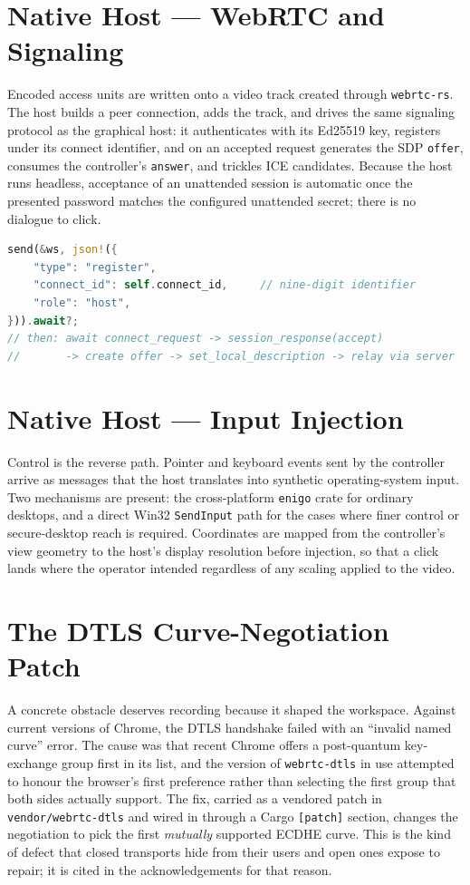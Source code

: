 \section{Native Host --- WebRTC and Signaling}

Encoded access units are written onto a video track created through
\texttt{webrtc-rs}. The host builds a peer connection, adds the track, and drives
the same signaling protocol as the graphical host: it authenticates with its
Ed25519 key, registers under its connect identifier, and on an accepted request
generates the SDP \texttt{offer}, consumes the controller's \texttt{answer}, and
trickles ICE candidates. Because the host runs headless, acceptance of an
unattended session is automatic once the presented password matches the
configured unattended secret; there is no dialogue to click.

\begin{lstlisting}[language=Rust,caption={Registering the native host after authentication.}]
send(&ws, json!({
    "type": "register",
    "connect_id": self.connect_id,     // nine-digit identifier
    "role": "host",
})).await?;
// then: await connect_request -> session_response(accept)
//       -> create offer -> set_local_description -> relay via server
\end{lstlisting}

\section{Native Host --- Input Injection}

Control is the reverse path. Pointer and keyboard events sent by the controller
arrive as messages that the host translates into synthetic operating-system
input. Two mechanisms are present: the cross-platform \texttt{enigo} crate for
ordinary desktops, and a direct Win32 \texttt{SendInput} path for the cases where
finer control or secure-desktop reach is required. Coordinates are mapped from
the controller's view geometry to the host's display resolution before
injection, so that a click lands where the operator intended regardless of any
scaling applied to the video.

\section{The DTLS Curve-Negotiation Patch}

A concrete obstacle deserves recording because it shaped the workspace. Against
current versions of Chrome, the DTLS handshake failed with an ``invalid named
curve'' error. The cause was that recent Chrome offers a post-quantum key-exchange
group first in its list, and the version of \texttt{webrtc-dtls} in use attempted
to honour the browser's first preference rather than selecting the first group
that both sides actually support. The fix, carried as a vendored patch in
\texttt{vendor/webrtc-dtls} and wired in through a Cargo \texttt{[patch]} section,
changes the negotiation to pick the first \emph{mutually} supported ECDHE curve.
This is the kind of defect that closed transports hide from their users and open
ones expose to repair; it is cited in the acknowledgements for that reason.

